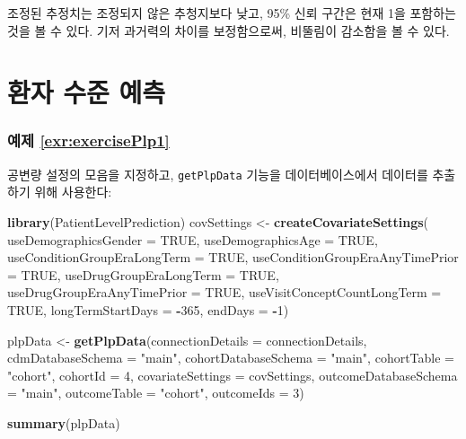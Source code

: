 \documentclass[10.5pt]{book}
\newenvironment{Shaded}{\begin{snugshade}}{\end{snugshade}}
\newcommand{\KeywordTok}[1]{\textcolor[rgb]{0.13,0.29,0.53}{\textbf{#1}}}
\newcommand{\DataTypeTok}[1]{\textcolor[rgb]{0.13,0.29,0.53}{#1}}
\newcommand{\DecValTok}[1]{\textcolor[rgb]{0.00,0.00,0.81}{#1}}
\newcommand{\StringTok}[1]{\textcolor[rgb]{0.31,0.60,0.02}{#1}}
\newcommand{\OtherTok}[1]{\textcolor[rgb]{0.56,0.35,0.01}{#1}}
\newcommand{\OperatorTok}[1]{\textcolor[rgb]{0.81,0.36,0.00}{\textbf{#1}}}
\newcommand{\NormalTok}[1]{#1}
\theoremstyle{definition}
\theoremstyle{definition}
\theoremstyle{definition}
\theoremstyle{remark}
\begin{document}
조정된 추정치는 조정되지 않은 추청지보다 낮고, 95\% 신뢰 구간은 현재 1을
포함하는 것을 볼 수 있다. 기저 과거력의 차이를 보정함으로써, 비뚤림이
감소함을 볼 수 있다.

\section{환자 수준 예측}\label{Plpanswers}

\subsubsection*{예제 \ref{exr:exercisePlp1}}\label{-refexrexerciseplp1}

공변량 설정의 모음을 지정하고, \texttt{getPlpData} 기능을
데이터베이스에서 데이터를 추출하기 위해 사용한다:

\begin{Shaded}
\begin{Highlighting}[]
\KeywordTok{library}\NormalTok{(PatientLevelPrediction)}
\NormalTok{covSettings <-}\StringTok{ }\KeywordTok{createCovariateSettings}\NormalTok{(}
  \DataTypeTok{useDemographicsGender =} \OtherTok{TRUE}\NormalTok{,}
  \DataTypeTok{useDemographicsAge =} \OtherTok{TRUE}\NormalTok{,}
  \DataTypeTok{useConditionGroupEraLongTerm =} \OtherTok{TRUE}\NormalTok{,}
  \DataTypeTok{useConditionGroupEraAnyTimePrior =} \OtherTok{TRUE}\NormalTok{,}
  \DataTypeTok{useDrugGroupEraLongTerm =} \OtherTok{TRUE}\NormalTok{,}
  \DataTypeTok{useDrugGroupEraAnyTimePrior =} \OtherTok{TRUE}\NormalTok{,}
  \DataTypeTok{useVisitConceptCountLongTerm =} \OtherTok{TRUE}\NormalTok{,}
  \DataTypeTok{longTermStartDays =} \OperatorTok{-}\DecValTok{365}\NormalTok{,}
  \DataTypeTok{endDays =} \OperatorTok{-}\DecValTok{1}\NormalTok{)}

\NormalTok{plpData <-}\StringTok{ }\KeywordTok{getPlpData}\NormalTok{(}\DataTypeTok{connectionDetails =}\NormalTok{ connectionDetails,}
                      \DataTypeTok{cdmDatabaseSchema =} \StringTok{"main"}\NormalTok{,}
                      \DataTypeTok{cohortDatabaseSchema =} \StringTok{"main"}\NormalTok{,}
                      \DataTypeTok{cohortTable =} \StringTok{"cohort"}\NormalTok{,}
                      \DataTypeTok{cohortId =} \DecValTok{4}\NormalTok{,}
                      \DataTypeTok{covariateSettings =}\NormalTok{ covSettings,}
                      \DataTypeTok{outcomeDatabaseSchema =} \StringTok{"main"}\NormalTok{,}
                      \DataTypeTok{outcomeTable =} \StringTok{"cohort"}\NormalTok{,}
                      \DataTypeTok{outcomeIds =} \DecValTok{3}\NormalTok{)}

\KeywordTok{summary}\NormalTok{(plpData)}
\end{Highlighting}
\end{Shaded}
\end{document}
